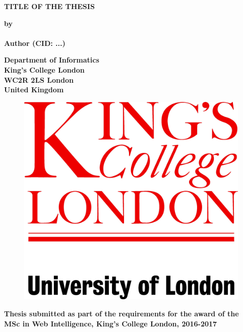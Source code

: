 \thispagestyle{empty}
\null\vskip0.2in%
\begin{center}
\LARGE{{\bf 
TITLE OF THE THESIS}}
\end{center}

\vspace{0.5cm}

\begin{center}
{\Large {\bf by}}\\
\mbox{} \\
{\Large {\bf Author (CID: ...)}}
\end{center}

\vspace{1cm}

\begin{center}
\large{\bf{Department of Informatics \\ King's College London \\
WC2R 2LS London \\ United Kingdom}}
\end{center}


\vspace{1.5cm}

\begin{figure}[!h]
\centering
\includegraphics[scale=0.3]{Kings_Logo.jpg}
\end{figure}

\vspace{1.5cm}

\begin{center}
\large{\bf{Thesis submitted as part of the requirements for the award of the \\
MSc in Web Intelligence, King's College London, 2016-2017}}
\end{center}

\vspace{2cm}

